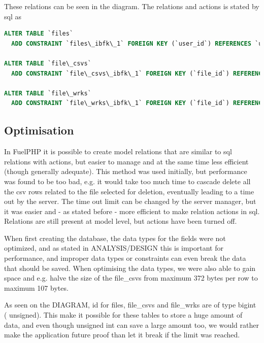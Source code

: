 These relations can be seen in the diagram. The relations and actions is stated by sql as
\begin{lstlisting}[language=sql]
ALTER TABLE `files`
  ADD CONSTRAINT `files\_ibfk\_1` FOREIGN KEY (`user_id`) REFERENCES `users` (`id`) ON DELETE NO ACTION ON UPDATE NO ACTION;

ALTER TABLE `file\_csvs`
  ADD CONSTRAINT `file\_csvs\_ibfk\_1` FOREIGN KEY (`file_id`) REFERENCES `files` (`id`) ON DELETE CASCADE ON UPDATE NO ACTION;

ALTER TABLE `file\_wrks`
  ADD CONSTRAINT `file\_wrks\_ibfk\_1` FOREIGN KEY (`file_id`) REFERENCES `files` (`id`) ON DELETE CASCADE ON UPDATE NO ACTION;
\end{lstlisting}

\subsection{Optimisation}

In FuelPHP it is possible to create model relations that are similar to sql relations with actions, but easier to manage and at the same time less efficient (though generally adequate). This method was used initially, but performance was found to be too bad, e.g. it would take too much time to cascade delete all the csv rows related to the file selected for deletion, eventually leading to a time out by the server. The time out limit can be changed by the server manager, but it was easier and - as stated before - more efficient to make relation actions in sql. Relations are still present at model level, but actions have been turned off.

When first creating the database, the data types for the fields were not optimized, and as stated in ANALYSIS/DESIGN this is important for performance, and improper data types or constraints can even break the data that should be saved. When optimising the data types, we were also able to gain space and e.g. halve the size of the \textsf{file\_csvs} from maximum 372 bytes per row to maximum 107 bytes.

As seen on the DIAGRAM, \textsf{id} for  \textsf{files, file\_csvs} and  \textsf{file\_wrks} are of type \textsf{bigint} ( \textsf{unsigned}). This make it possible for these tables to store a huge amount of data, and even though \textsf{unsigned int} can save a large amount too, we would rather make the application future proof than let it break if the limit was reached.

